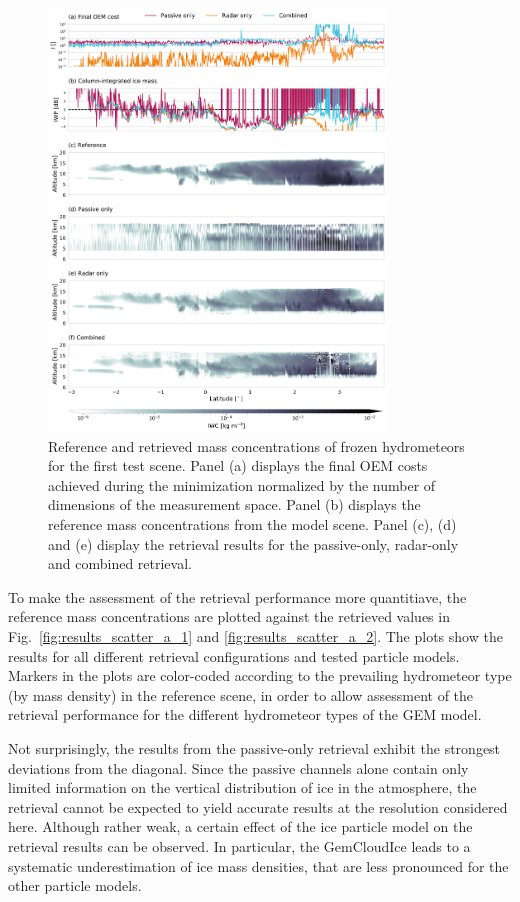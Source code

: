 \documentclass[journal abbreviation, manuscript]{copernicus}
\begin{document}
\begin{figure}
\centering
\includegraphics[width = 0.8\textwidth]{../plots/results_a_LargePlateAggregate}
\caption{Reference and retrieved mass concentrations of frozen hydrometeors for
 the first test scene. Panel (a) displays the final OEM costs achieved during
 the minimization normalized by the number of dimensions of the measurement
 space. Panel (b) displays the reference mass concentrations from the model
 scene. Panel (c), (d) and (e) display the retrieval results for the
 passive-only, radar-only and combined retrieval.}
\label{fig:results_a}
\end{figure}

To make the assessment of the retrieval performance more quantitiave, the
reference mass concentrations are plotted against the retrieved values in
Fig.~\ref{fig:results_scatter_a_1} and \ref{fig:results_scatter_a_2}. The plots
show the results for all different retrieval configurations and tested
particle models. Markers in the plots are color-coded according to the
prevailing hydrometeor type (by mass density) in the reference scene, in order
to allow assessment of the retrieval performance for the different hydrometeor
types of the GEM model.

Not surprisingly, the results from the passive-only retrieval exhibit the
strongest deviations from the diagonal. Since the passive channels alone contain
only limited information on the vertical distribution of ice in the atmosphere,
the retrieval cannot be expected to yield accurate results at the resolution
considered here. Although rather weak, a certain effect of the ice particle
model on the retrieval results can be observed. In particular, the GemCloudIce
leads to a systematic underestimation of ice mass densities, that are less
pronounced for the other particle models.
\end{document}
